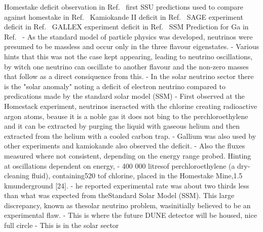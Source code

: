 Homestake deficit observation in Ref.~\cite{davis1968}
first SSU predictions used to compare against homestake in Ref.~\cite{bahcall1968}
Kamiokande II deficit in Ref.~\cite{hirata1989}
SAGE experiment deficit in Ref.~\cite{abazov1991}
GALLEX experiment deficit in Ref.~\cite{anselmann1994}
SSM Prediction for Ga in Ref.~\cite{bahcall1988}
- As the standard model of particle physics was developed, neutrinos were presumed to be massless and occur only in the three flavour eigenstates.
- Various hints that this was not the case kept appearing, leading to neutrino oscillations, by witch one neutrino can oscillate to another flavour and the non-zero masses that follow as a direct consiquence from this.
- In the solar neutrino sector there is the "solar anomaly" noting a deficit of electron neutrino compared to predications made by the standard solar model (SSM)
- First observed at the Homestack experiment, neutrinos ineracted with the chlorine creating radioactive argon atoms, beause it is a noble gas it does not bing to the perchloroethylene and it can be extracted by purging the liquid with gaseous helium and then extracted from the helium with a cooled carbon trap.
- Gallium was also used by other experiments and kamiokande also observed the deficit.
- Also the fluxes measured where not consistent, depending on the energy range probed. Hinting at oscillations dependent on energy,
- 400 000 litresof perchloroethylene (a dry-cleaning fluid), containing520 tof chlorine, placed in the Homestake Mine,1.5 kmunderground [24].
- he reported experimental rate was about two thirds less than what was expected from theStandard Solar Model (SSM). This large discrepancy, known as thesolar  neutrino  problem, wasinitially believed to be an experimental flaw. 
- This is where the future DUNE detector will be housed, nice full circle
- This is in the solar sector

